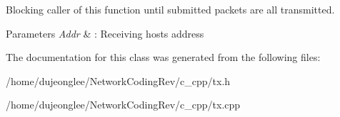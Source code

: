 Blocking caller of this function until submitted packets are all transmitted. 


\begin{DoxyParams}{Parameters}
{\em Addr} & \+: Receiving host\textquotesingle{}s address \\
\hline
\end{DoxyParams}


The documentation for this class was generated from the following files\+:\begin{DoxyCompactItemize}
\item 
/home/dujeonglee/\+Network\+Coding\+Rev/c\+\_\+cpp/tx.\+h\item 
/home/dujeonglee/\+Network\+Coding\+Rev/c\+\_\+cpp/tx.\+cpp\end{DoxyCompactItemize}
